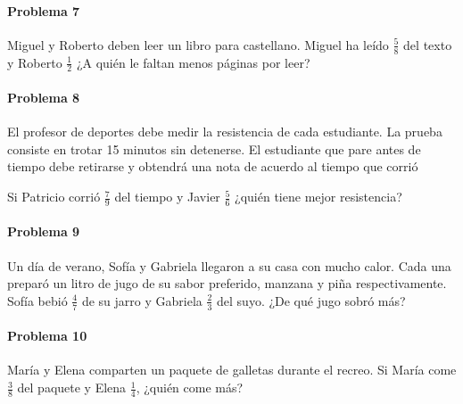 \documentclass[10pt,twoside]{article}
\begin{document}
\paragraph*{Problema 7}
Miguel y Roberto deben leer un libro para castellano. Miguel ha le\'{i}do $\frac{5}{8}$ del texto y Roberto $\frac{1}{2}$ ¿A qui\'{e}n le faltan menos p\'{a}ginas por leer?
\paragraph*{Problema 8}
El profesor de deportes debe medir la resistencia de cada estudiante. La prueba consiste en trotar 15 minutos sin detenerse. El estudiante que pare antes de tiempo debe retirarse y obtendr\'{a} una nota de acuerdo al tiempo que corri\'{o}

Si Patricio corri\'{o} $\frac{7}{9}$ del tiempo y Javier $\frac{5}{6}$ ¿qui\'{e}n tiene mejor resistencia?
\paragraph*{Problema 9}
Un d\'{i}a de verano, Sof\'{i}a y Gabriela llegaron a su casa con mucho calor. Cada una prepar\'{o} un litro de jugo de su sabor preferido, manzana y piña respectivamente. Sof\'{i}a bebi\'{o} $\frac{4}{7}$ de su jarro y Gabriela $\frac{2}{3}$ del suyo. ¿De qu\'{e} jugo sobr\'{o} m\'{a}s?
\paragraph*{Problema 10}
Mar\'{i}a y Elena comparten un paquete de galletas durante el recreo. Si Mar\'{i}a come $\frac{3}{8}$ del paquete y Elena $\frac{1}{4}$, ¿qui\'{e}n come m\'{a}s?
\end{document}

